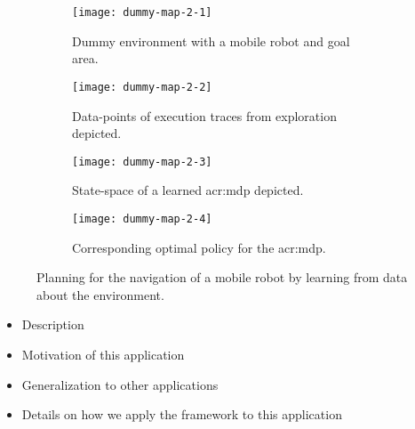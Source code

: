 \begin{figure}[t]
\centering

\captionsetup{font=small}
\captionsetup[subfigure]{font=footnotesize}
\captionsetup[subfigure]{justification=centering}
\begin{subfigure}{.5\textwidth}
	\centering
	\texttt{[image: dummy-map-2-1]}
	\caption{Dummy environment with a mobile robot and goal area.}
	\label{fig:dummy-map-1}
\end{subfigure}\hfill
\begin{subfigure}{.5\textwidth}
	\centering
	\texttt{[image: dummy-map-2-2]}
	\caption{Data-points of execution traces from exploration depicted.}
	\label{fig:dummy-map-2}
\end{subfigure}

\bigskip

\begin{subfigure}{.5\textwidth}
	\centering
	\texttt{[image: dummy-map-2-3]}
	\caption{State-space of a learned \acrshort{acr:mdp} depicted.}
	\label{fig:dummy-map-3}
\end{subfigure}\hfill
\begin{subfigure}{.5\textwidth}
	\centering
	\texttt{[image: dummy-map-2-4]}
	\caption{Corresponding optimal policy for the \acrshort{acr:mdp}.}
	\label{fig:dummy-map-4}
\end{subfigure}
	\caption{Planning for the navigation of a mobile robot by learning  from data about the environment.}
\end{figure}

\begin{itemize}
	\item Description
	\item Motivation of this application
	\item Generalization to other applications
	\item Details on how we apply the framework to this application
\end{itemize}

